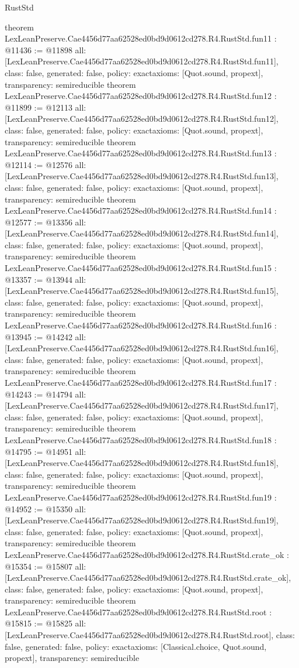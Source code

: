\begin{lexlean}{RustStd}
\begin{coremodule}
{}
theorem LexLeanPreserve.Cae4456d77aa62528ed0bd9d0612cd278.R4.RustStd.fun11 : @11436 := @11898 {
  all: [LexLeanPreserve.Cae4456d77aa62528ed0bd9d0612cd278.R4.RustStd.fun11],
  class: false,
  generated: false,
  policy: exact{axioms: [Quot.sound, propext]},
  transparency: semireducible
}
theorem LexLeanPreserve.Cae4456d77aa62528ed0bd9d0612cd278.R4.RustStd.fun12 : @11899 := @12113 {
  all: [LexLeanPreserve.Cae4456d77aa62528ed0bd9d0612cd278.R4.RustStd.fun12],
  class: false,
  generated: false,
  policy: exact{axioms: [Quot.sound, propext]},
  transparency: semireducible
}
theorem LexLeanPreserve.Cae4456d77aa62528ed0bd9d0612cd278.R4.RustStd.fun13 : @12114 := @12576 {
  all: [LexLeanPreserve.Cae4456d77aa62528ed0bd9d0612cd278.R4.RustStd.fun13],
  class: false,
  generated: false,
  policy: exact{axioms: [Quot.sound, propext]},
  transparency: semireducible
}
theorem LexLeanPreserve.Cae4456d77aa62528ed0bd9d0612cd278.R4.RustStd.fun14 : @12577 := @13356 {
  all: [LexLeanPreserve.Cae4456d77aa62528ed0bd9d0612cd278.R4.RustStd.fun14],
  class: false,
  generated: false,
  policy: exact{axioms: [Quot.sound, propext]},
  transparency: semireducible
}
theorem LexLeanPreserve.Cae4456d77aa62528ed0bd9d0612cd278.R4.RustStd.fun15 : @13357 := @13944 {
  all: [LexLeanPreserve.Cae4456d77aa62528ed0bd9d0612cd278.R4.RustStd.fun15],
  class: false,
  generated: false,
  policy: exact{axioms: [Quot.sound, propext]},
  transparency: semireducible
}
theorem LexLeanPreserve.Cae4456d77aa62528ed0bd9d0612cd278.R4.RustStd.fun16 : @13945 := @14242 {
  all: [LexLeanPreserve.Cae4456d77aa62528ed0bd9d0612cd278.R4.RustStd.fun16],
  class: false,
  generated: false,
  policy: exact{axioms: [Quot.sound, propext]},
  transparency: semireducible
}
theorem LexLeanPreserve.Cae4456d77aa62528ed0bd9d0612cd278.R4.RustStd.fun17 : @14243 := @14794 {
  all: [LexLeanPreserve.Cae4456d77aa62528ed0bd9d0612cd278.R4.RustStd.fun17],
  class: false,
  generated: false,
  policy: exact{axioms: [Quot.sound, propext]},
  transparency: semireducible
}
theorem LexLeanPreserve.Cae4456d77aa62528ed0bd9d0612cd278.R4.RustStd.fun18 : @14795 := @14951 {
  all: [LexLeanPreserve.Cae4456d77aa62528ed0bd9d0612cd278.R4.RustStd.fun18],
  class: false,
  generated: false,
  policy: exact{axioms: [Quot.sound, propext]},
  transparency: semireducible
}
theorem LexLeanPreserve.Cae4456d77aa62528ed0bd9d0612cd278.R4.RustStd.fun19 : @14952 := @15350 {
  all: [LexLeanPreserve.Cae4456d77aa62528ed0bd9d0612cd278.R4.RustStd.fun19],
  class: false,
  generated: false,
  policy: exact{axioms: [Quot.sound, propext]},
  transparency: semireducible
}
theorem LexLeanPreserve.Cae4456d77aa62528ed0bd9d0612cd278.R4.RustStd.crate_ok : @15354 := @15807 {
  all: [LexLeanPreserve.Cae4456d77aa62528ed0bd9d0612cd278.R4.RustStd.crate_ok],
  class: false,
  generated: false,
  policy: exact{axioms: [Quot.sound, propext]},
  transparency: semireducible
}
theorem LexLeanPreserve.Cae4456d77aa62528ed0bd9d0612cd278.R4.RustStd.root : @15815 := @15825 {
  all: [LexLeanPreserve.Cae4456d77aa62528ed0bd9d0612cd278.R4.RustStd.root],
  class: false,
  generated: false,
  policy: exact{axioms: [Classical.choice, Quot.sound, propext]},
  transparency: semireducible
}


\end{coremodule}
\end{lexlean}
